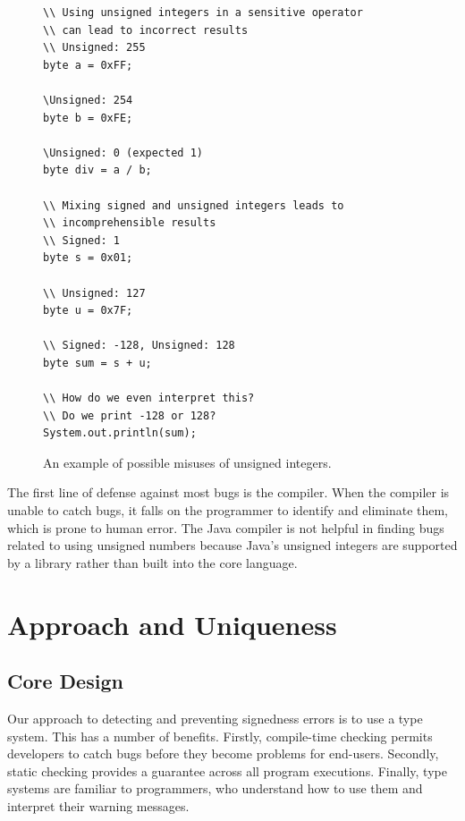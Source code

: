 \begin{figure}[t]
\begin{lstlisting}
\\ Using unsigned integers in a sensitive operator
\\ can lead to incorrect results
\\ Unsigned: 255
byte a = 0xFF;

\Unsigned: 254
byte b = 0xFE;

\Unsigned: 0 (expected 1)
byte div = a / b;

\\ Mixing signed and unsigned integers leads to
\\ incomprehensible results
\\ Signed: 1
byte s = 0x01;

\\ Unsigned: 127
byte u = 0x7F;

\\ Signed: -128, Unsigned: 128
byte sum = s + u;

\\ How do we even interpret this?
\\ Do we print -128 or 128?
System.out.println(sum);
\end{lstlisting}
\vspace{-10pt}
\caption{An example of possible misuses of unsigned integers.}
\label{fig:misuse}
\end{figure}

The first line of defense against most bugs is the compiler. When the
compiler is unable to catch bugs, it falls on the programmer to identify and
eliminate them, which is prone to human error. The Java compiler
is not helpful in finding bugs related to using unsigned
numbers because Java's unsigned
integers are supported by a library rather than built into the core language.

\section{Approach and Uniqueness}

\subsection{Core Design}

Our approach to detecting and preventing signedness errors is to use a type
system. This has a number of benefits. Firstly, compile-time checking permits
developers
to catch bugs before they become problems for end-users. Secondly, static
checking provides a guarantee across all program executions.
Finally, type systems are familiar to programmers,
who understand how to use them
and interpret their warning messages.

